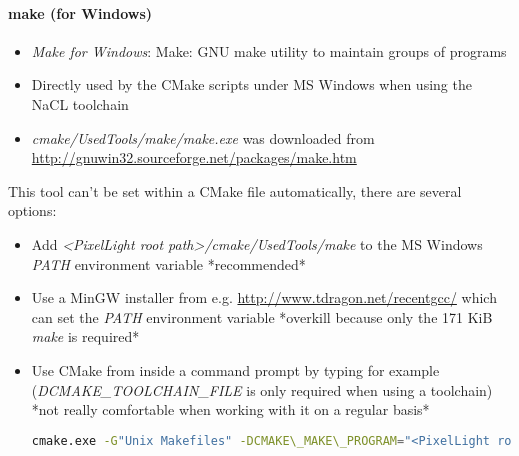 \paragraph{make (for Windows)}
\begin{itemize}
\item{\emph{Make for Windows}: Make: GNU make utility to maintain groups of programs}
\item{Directly used by the CMake scripts under \ac{MS} Windows when using the \ac{NaCL} toolchain}
\item{\emph{cmake/UsedTools/make/make.exe} was downloaded from \url{http://gnuwin32.sourceforge.net/packages/make.htm}}
\end{itemize}
This tool can't be set within a CMake file automatically, there are several options:
\begin{itemize}
\item{Add \emph{\textless PixelLight root path\textgreater /cmake/UsedTools/make} to the \ac{MS} Windows \emph{PATH} environment variable *recommended*}
\item{Use a MinGW installer from e.g. \url{http://www.tdragon.net/recentgcc/} which can set the \emph{PATH} environment variable *overkill because only the 171 KiB \emph{make} is required*}
\item{Use CMake from inside a command prompt by typing for example (\emph{DCMAKE\_TOOLCHAIN\_FILE} is only required when using a toolchain) \\ *not really comfortable when working with it on a regular basis*
\begin{lstlisting}[language=sh]
cmake.exe -G"Unix Makefiles" -DCMAKE\_MAKE\_PROGRAM="<PixelLight root path>/cmake/UsedTools/make/make.exe" -DCMAKE\_TOOLCHAIN\_FILE="<PixelLight root path>/cmake/Toolchains/Toolchain-nacl.cmake"
\end{lstlisting}
}
\end{itemize}




